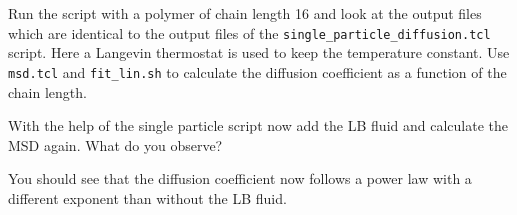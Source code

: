 Run the script with a polymer of chain length 16 and look at the output files
which are identical to the output files of the \lstinline|single_particle_diffusion.tcl|
script. Here a Langevin thermostat is used to keep the temperature constant.
Use \lstinline|msd.tcl| and \lstinline|fit_lin.sh| to calculate the diffusion
coefficient as a function of the chain length.


With the help of the single particle script now add the LB fluid and calculate
the MSD again. What do you observe?

You should see that the diffusion coefficient now follows a power law with
a different exponent than without the LB fluid.

